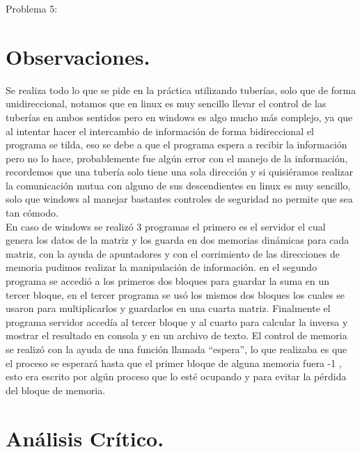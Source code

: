 \documentclass[12pt]{article}
\begin{document}
   
   
   Problema 5:
   
   
   
   
 
   
  
   


\section{Observaciones.}
Se realiza todo lo que se pide en la práctica utilizando tuberías, solo que de forma unidireccional, notamos que en linux es muy sencillo llevar el control de las tuberías en ambos sentidos pero en windows es algo mucho más complejo, ya que al intentar hacer el intercambio de información de forma bidireccional el programa se tilda, eso se debe a que el programa espera a recibir la información pero no lo hace, probablemente fue algún error con el manejo de la información, recordemos que una tubería solo tiene una sola dirección y si quisiéramos realizar la comunicación mutua con alguno de sus descendientes en linux es muy sencillo, solo que windows al manejar bastantes controles de seguridad no permite que sea tan cómodo.\\

En caso de windows se realizó 3 programas el primero es el servidor el cual genera los datos de la matriz y los guarda en dos memorias dinámicas para cada  matriz, con la ayuda de apuntadores y con el corrimiento de las direcciones de memoria pudimos realizar la manipulación de información. en el segundo programa se accedió a los primeros dos bloques para guardar  la suma en un tercer bloque, en el tercer programa se usó los mismos dos bloques los cuales se usaron para multiplicarlos y guardarlos en una cuarta matriz. Finalmente el programa servidor accedía al tercer bloque y al cuarto para calcular la inversa y mostrar el resultado en consola y en un archivo de texto.
El control de memoria se realizó con la ayuda de una función llamada “espera”, lo que realizaba es que el proceso se esperará hasta que el primer bloque de alguna memoria  fuera -1 , esto era escrito por algún proceso que lo esté ocupando y para evitar la pérdida del bloque de memoria.



\section{Análisis Crítico.}
\end{document}
